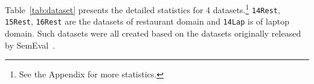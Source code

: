 \documentclass[11pt,a4paper]{article}
\begin{document}
Table~\ref{tab:dataset} presents the detailed statistics for 4 datasets.\footnote{See the Appendix for more statistics.}
{\texttt{14Rest}}, {\texttt{15Rest}}, {\texttt{16Rest}} are the datasets of restaurant  domain and  {\texttt{14Lap}} is of laptop  domain.
Such datasets were all created based on the datasets originally released by SemEval~\cite{pontiki-EtAl:2014:SemEval,pontiki-etal-2015-semeval,pontiki2016semeval, fan-etal-2019-target}.
\end{document}
